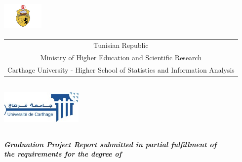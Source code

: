 \documentclass[a4paper, oneside]{report}
\title{\reportSubject}
\author{\reportAuthor}
\newcommand{\reportTitle} {%
  \textsc{Graduation Project Report}
}
\newcommand{\studyDepartment} {%
  Entreprise d'accueil %
}
\newcommand{\ESSAI} {%
  Higher School of Statistics and Information Analysis
}
\begin{document}
\thispagestyle{empty}
\begin{titlepage}
\begin{center}


\includegraphics[width=2cm, height=1.5cm]{embleme.jpg}\\

{%
  \fontsize{9pt}{9pt}\selectfont%
  \begin{tabular}{c}
    Tunisian Republic\\
    Ministry of Higher Education and Scientific Research \\%
    Carthage University - \ESSAI{}  \\
  \end{tabular}
}

\vspace{10pt}
\includegraphics[width=4cm, height=2.5cm]{universite-carthage.jpg} \\


\vspace{10pt} {%
  \renewcommand*{\familydefault}{\defaultFont}
  \fontsize{46pt}{46pt}\selectfont%
}

\vspace{10pt}
\textbf{\textit{Graduation Project Report submitted in partial fulfillment of}}\\
\textbf{\textit{the requirements for the degree of}}\\


\end{center}
\end{titlepage}
\end{document}
